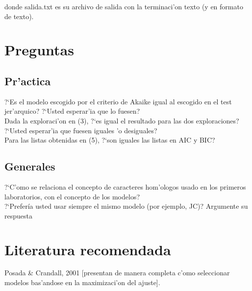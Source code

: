 donde salida.txt es su archivo de salida con la terminaci'on texto (y en formato de texto).
\section{Preguntas}
\subsection{Pr'actica}
\noindent
?`Es el modelo escogido por el criterio de Akaike igual al escogido en el test jer'arquico? ?`Usted esperar'ia que lo fuesen?\\
Dada la exploraci'on en (3), ?`es igual el resultado para las dos exploraciones? ?`Usted esperar'ia que fuesen iguales 'o desiguales?\\ 
Para las listas obtenidas en (5), ?`son iguales las listas en AIC y BIC?
\subsection{Generales}
\noindent
?`C'omo se relaciona el concepto de caracteres hom'ologos usado en los primeros laboratorios, con el concepto de los modelos?\\
?`Prefer\'ia usted usar siempre el mismo modelo (por ejemplo, JC)? Argumente su respuesta

\section{Literatura recomendada}
\noindent
Posada \& Crandall, 2001 [presentan de manera completa c'omo seleccionar modelos bas'andose en la maximizaci'on del ajuste].